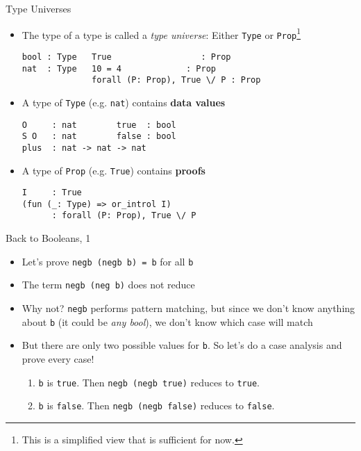 \begin{frame}[fragile]{Type Universes}
\begin{itemize}
  \item The type of a type is called a \textit{type universe}: Either \lstinline|Type| or \lstinline|Prop|\footnote{This is a simplified view that is sufficient for now.}
\begin{lstlisting}
bool : Type   True                  : Prop
nat  : Type   10 = 4             : Prop
              forall (P: Prop), True \/ P : Prop
\end{lstlisting}
\pause
  \item A type of \lstinline|Type| (e.g. \lstinline|nat|) contains \textbf{data values}
\begin{lstlisting}
O     : nat        true  : bool
S O   : nat        false : bool
plus  : nat -> nat -> nat
\end{lstlisting}
\pause
  \item A type of \lstinline|Prop| (e.g. \lstinline|True|) contains \textbf{proofs}
\begin{lstlisting}
I     : True
(fun (_: Type) => or_introl I)
      : forall (P: Prop), True \/ P
\end{lstlisting}
\end{itemize}
\end{frame}

\begin{frame}[fragile]{Back to Booleans, 1}

\begin{itemize}
  \item Let's prove \lstinline|negb (negb b) =|~\lstinline|b| for all \lstinline|b|
  \pause
  \item The term \lstinline|negb (neg b)| does not reduce
  \pause
  \item Why not? \lstinline|negb| performs pattern matching, but since we don't know anything about \lstinline|b| (it could be \textit{any bool}), we don't know which case will match
  \pause
  \item But there are only two possible values for \lstinline|b|. So let's do a case analysis and prove every case!
  \begin{enumerate}
    \item \lstinline|b| is \lstinline|true|. Then \lstinline|negb (negb true)| reduces to \lstinline|true|.
    \item \lstinline|b| is \lstinline|false|. Then \lstinline|negb (negb false)| reduces to \lstinline|false|.
  \end{enumerate}
\end{itemize}
\end{frame}

